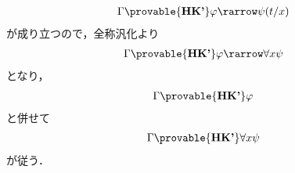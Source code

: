 \begin{metaprf}
\begin{description}
\begin{align}
				\Gamma \provable{\mbox{{\bf HK'}}} \varphi \rarrow \psi(t/x)
			\end{align}
			が成り立つので，全称汎化より
			\begin{align}
				\Gamma \provable{\mbox{{\bf HK'}}} \varphi \rarrow \forall x \psi
			\end{align}
			となり，
			\begin{align}
				\Gamma \provable{\mbox{{\bf HK'}}} \varphi
			\end{align}
			と併せて
			\begin{align}
				\Gamma \provable{\mbox{{\bf HK'}}} \forall x \psi
			\end{align}
			が従う．
			\QED
		\end{description}
	\end{metaprf}
	
\begin{comment}	
\subsection{汎化規則は{\bf HK'}から導かれる}
	{\bf HK}の量化公理に
	\begin{align}
		\forall x (\psi \rarrow \varphi) \rarrow
		(\forall x \psi \rarrow \forall x \varphi),
		\quad \mbox{ただし$\varphi$と$\psi$には$x$が自由に現れる}
	\end{align}
	を追加すれば，一般化規則は導かれる．
	
	\begin{screen}
		$x$と$t$を変項とし，$x$は$\psi$に自由に現れるとし，
		$t$は$\forall x \psi$に自由に現れないとする．．
		このとき
		\begin{align}
			\Gamma \provable{\mbox{{\bf HK'}}} \psi(t/x)
		\end{align}
		ならば
		\begin{align}
			\Gamma \provable{\mbox{{\bf HK'}}} \forall x \psi
		\end{align}
		である．
	\end{screen}
	
	\begin{sketch}
		$\provable{\mbox{{\bf HK'}}} \psi(t/x)$であるときは
		\begin{align}
			\provable{\mbox{{\bf HK}}} \forall x \psi
		\end{align}
		が成立する．$\varphi$が三段論法によって示されるとき，つまり式$\psi$で
		\begin{align}
			\Gamma &\provable{\mbox{{\bf HK}}} \psi, \\
			\Sigma &\provable{\mbox{{\bf HK}}} \psi \rarrow \varphi
		\end{align}
		を満たすものが取れるとき，$\psi$に$x$が自由に現れているかいないかで
		\begin{description}
			\item[case1] $\psi$に$x$が自由に現れていないとき，
				\begin{align}
					\Gamma \provable{\mbox{{\bf HK}}} \psi
				\end{align}
				かつ
				\begin{align}
					\Gamma \provable{\mbox{{\bf HK}}} \forall x (\psi \rarrow \varphi)
				\end{align}
				

\end{comment}
